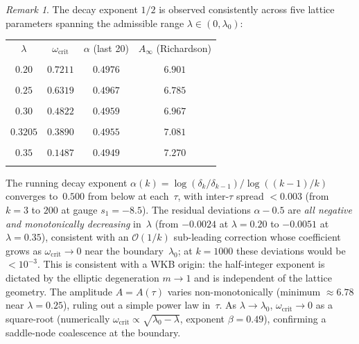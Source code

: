 \documentclass[11pt,a4paper]{article}
\theoremstyle{plain}
\theoremstyle{definition}
\theoremstyle{remark}
\newtheorem{remark}[theorem]{Remark}
\newcommand{\Oo}{\mathcal{O}}
\begin{document}
\begin{remark}
  The decay exponent $1/2$ is observed consistently across five
  lattice parameters spanning the admissible range
  $\lambda \in (0, \lambda_0)$:
  \begin{center}\small
  \begin{tabular}{cccc}
    \toprule
    $\lambda$ & $\omega_{\mathrm{crit}}$ & $\alpha$ (last 20) & $A_\infty$ (Richardson) \\\\
    \midrule
    $0.20$ & $0.7211$ & $0.4976$ & $6.901$ \\\\
    $0.25$ & $0.6319$ & $0.4967$ & $6.785$ \\\\
    $0.30$ & $0.4822$ & $0.4959$ & $6.967$ \\\\
    $0.3205$ & $0.3890$ & $0.4955$ & $7.081$ \\\\
    $0.35$ & $0.1487$ & $0.4949$ & $7.270$ \\\\
    \bottomrule
  \end{tabular}
  \end{center}
  The running decay exponent $\alpha(k) = \log(\delta_k/\delta_{k-1})
  /\log((k-1)/k)$ converges to~$0.500$ from below at each~$\tau$,
  with inter-$\tau$ spread $< 0.003$ (from $k = 3$ to $200$
  at gauge $s_1 = -8.5$).  The residual deviations
  $\alpha - 0.5$ are \emph{all negative and monotonically decreasing}
  in~$\lambda$ (from $-0.0024$ at $\lambda = 0.20$ to $-0.0051$
  at $\lambda = 0.35$), consistent with an $\Oo(1/k)$ sub-leading
  correction whose coefficient grows as $\omega_{\mathrm{crit}} \to 0$
  near the boundary~$\lambda_0$; at $k = 1000$ these deviations
  would be $< 10^{-3}$.
  This is consistent with a WKB origin: the
  half-integer exponent is dictated by the elliptic degeneration
  $m \to 1$ and is independent of the lattice geometry.
  The amplitude $A = A(\tau)$ varies non-monotonically (minimum
  $\approx 6.78$ near $\lambda = 0.25$), ruling out a simple
  power law in~$\tau$.  As $\lambda \to \lambda_0$,
  $\omega_{\mathrm{crit}} \to 0$ as a square-root
  (numerically $\omega_{\mathrm{crit}} \propto
  \sqrt{\lambda_0 - \lambda}$, exponent $\beta = 0.49$),
  confirming a saddle-node coalescence at the boundary.
\end{remark}
\end{document}
